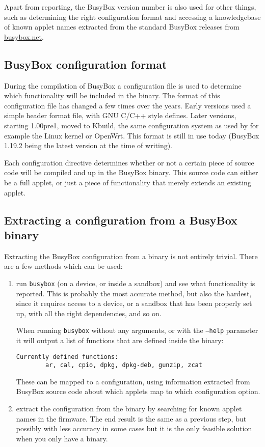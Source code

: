 \documentclass[10pt]{article}
\begin{document}
Apart from reporting, the BusyBox version number is also used for other
things, such as determining the right configuration format and accessing a
knowledgebase of known applet names extracted from the standard BusyBox
releases from \url{busybox.net}.

\subsection{BusyBox configuration format}

During the compilation of BusyBox a configuration file is used to determine
which functionality will be included in the binary. The format of this
configuration file has changed a few times over the years. Early versions used
a simple header format file, with GNU C/C++ style defines. Later versions,
starting 1.00pre1, moved to Kbuild, the same configuration system as used by
for example the Linux kernel or OpenWrt. This format is still in use today
(BusyBox 1.19.2 being the latest version at the time of writing).

Each configuration directive determines whether or not a certain piece of
source code will be compiled and up in the BusyBox binary. This source code can
either be a full applet, or just a piece of functionality that merely extends
an existing applet.

\subsection{Extracting a configuration from a BusyBox binary}

Extracting the BusyBox configuration from a binary is not entirely trivial.
There are a few methods which can be used:

\begin{enumerate}
\item run \texttt{busybox} (on a device, or inside a sandbox) and see what
functionality is reported. This is probably the most accurate method, but also
the hardest, since it requires access to a device, or a sandbox that has been
properly set up, with all the right dependencies, and so on.

When running \texttt{busybox} without any arguments, or with the \texttt{--help}
parameter it will output a list of functions that are defined inside the
binary:

\begin{verbatim}
Currently defined functions:
        ar, cal, cpio, dpkg, dpkg-deb, gunzip, zcat
\end{verbatim}

These can be mapped to a configuration, using information extracted from
BusyBox source code about which applets map to which configuration option.
\item extract the configuration from the binary by searching for known applet
names in the firmware. The end result is the same as a previous step, but
possibly with less accuracy in some cases but it is the only feasible solution
when you only have a binary.
\end{enumerate}
\end{document}
